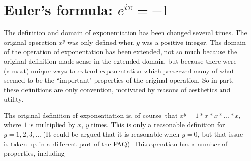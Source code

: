 
\section{Euler's formula: $e^{i \pi} = - 1 $}

The definition and domain of exponentiation has been changed several
 times.  The original operation $x^y$ was only defined when $y$
was a positive integer.  The domain of the operation of
exponentation has been extended, not so much because the original
definition made sense in the extended domain, but because there were
(almost) unique ways to extend exponentation which preserved many of
what seemed to be the ``important" properties of the original operation.
So in part, these definitions are only convention, motivated by
reasons of aesthetics and utility.

The original definition of exponentiation is, of course, that $x^y = 1 * x *
x * ... * x,$ where $1$ is multiplied by $x$,  $y$ times.  This is only
a reasonable definition for $y=1, 2, 3, ...$  (It could be argued that it
is reasonable when $y=0$, but that issue is taken up in a different part
of the FAQ).  This operation has a number of properties, including

